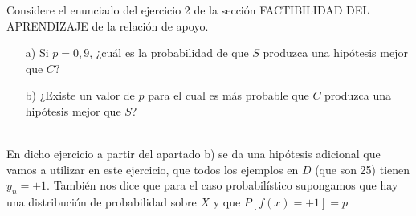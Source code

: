 \documentclass[12pt]{article}
\theoremstyle{definition}
\begin{document}
\begin{pregunta}
Considere el enunciado del ejercicio 2 de la sección FACTIBILIDAD DEL APRENDIZAJE de la relación de apoyo.
\begin{enumerate}
\item[a)] Si $p=0,9$, ¿cuál es la probabilidad de que $S$ produzca una hipótesis mejor que $C$?
\item[b)] ¿Existe un valor de $p$ para el cual es más probable que $C$ produzca una hipótesis mejor que $S$?
\end{enumerate}
\textit{ }\\

En dicho ejercicio a partir del apartado b) se da una hipótesis adicional que vamos a utilizar en este ejercicio, que todos los ejemplos en $D$ (que son 25) tienen $y_n=+1$. También nos dice que para el caso probabilístico supongamos que hay una distribución de probabilidad sobre $X$ y que $P[f(x)=+1] = p$
\begin{enumerate}

\end{enumerate}
\end{pregunta}
\end{document}
